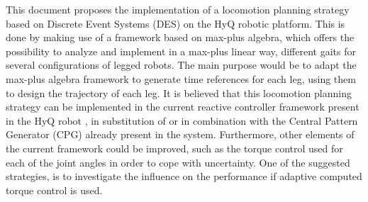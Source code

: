 \documentclass[../main.tex]{subfiles}
\begin{document}
This document proposes the implementation of a locomotion planning strategy based on Discrete Event Systems (DES) on the HyQ robotic platform. This is done by making use of a framework based on max-plus algebra, which offers the possibility to analyze and implement in a max-plus linear way, different gaits for several configurations of legged robots. The main purpose would be to adapt the max-plus algebra framework to generate time references for each leg, using them to design the trajectory of each leg. It is believed that this locomotion planning strategy can be implemented in the current reactive controller framework present in the HyQ robot \cite{Barasuola}, in substitution of or in combination with the Central Pattern Generator (CPG) already present in the system. Furthermore, other elements of the current framework could be improved, such as the torque control used for each of the joint angles in order to cope with uncertainty. One of the suggested strategies, is to investigate the influence on the performance if adaptive computed torque control is used. 

\iffalse
\begin{itemize}
	\item Importance of robot locomotion
	\item Advantages of legged robots over wheeled robots
	\item Nonlinear descriptions of CPG
	\item Current locomotion planning techniques do not perform with robustness, reliability and flexibility it is needed
	\item Gait switching problems
	\item importance of investigating new planning strategies to analyze the problem from a differente perspective
	\item why max-plus? Gait switching, variation of parameters more intuitive, less computationally expensive
	\item disadvantages, no work has been done on aerial phases
\end{itemize}
\fi
	
\end{document}
